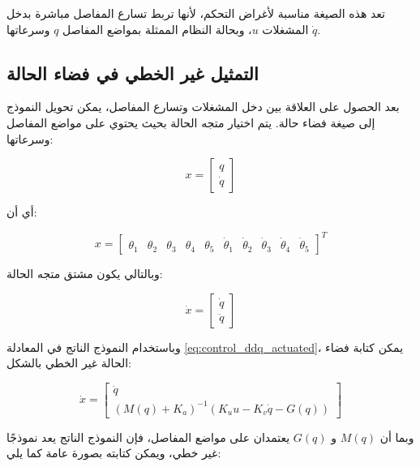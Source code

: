 تعد هذه الصيغة مناسبة لأغراض التحكم، لأنها تربط تسارع المفاصل مباشرة بدخل المشغلات \(u\)، وبحالة النظام الممثلة بمواضع المفاصل \(q\) وسرعاتها \(\dot{q}\).

\subsection{التمثيل غير الخطي في فضاء الحالة}

بعد الحصول على العلاقة بين دخل المشغلات وتسارع المفاصل، يمكن تحويل النموذج إلى صيغة فضاء حالة. يتم اختيار متجه الحالة بحيث يحتوي على مواضع المفاصل وسرعاتها:

\begin{equation}
x=
\begin{bmatrix}
q\\
\dot{q}
\end{bmatrix}
\label{eq:control_state_vector}
\end{equation}

أي أن:

\begin{equation}
x=
\begin{bmatrix}
\theta_1 &
\theta_2 &
\theta_3 &
\theta_4 &
\theta_5 &
\dot{\theta}_1 &
\dot{\theta}_2 &
\dot{\theta}_3 &
\dot{\theta}_4 &
\dot{\theta}_5
\end{bmatrix}^{T}
\label{eq:control_state_vector_explicit}
\end{equation}

وبالتالي يكون مشتق متجه الحالة:

\begin{equation}
\dot{x}
=
\begin{bmatrix}
\dot{q}\\
\ddot{q}
\end{bmatrix}
\label{eq:control_state_derivative}
\end{equation}

وباستخدام النموذج الناتج في المعادلة \eqref{eq:control_ddq_actuated}، يمكن كتابة فضاء الحالة غير الخطي بالشكل:

\begin{equation}
\dot{x}
=
\begin{bmatrix}
\dot{q}\\
\left(M(q)+K_a\right)^{-1}
\left(
K_u u-K_v\dot{q}-G(q)
\right)
\end{bmatrix}
\label{eq:control_nonlinear_state_space}
\end{equation}

وبما أن \(M(q)\) و \(G(q)\) يعتمدان على مواضع المفاصل، فإن النموذج الناتج يعد نموذجًا غير خطي، ويمكن كتابته بصورة عامة كما يلي:

